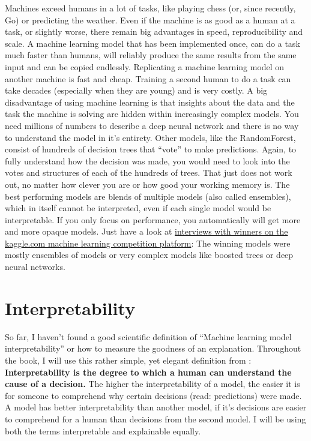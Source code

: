 \documentclass[12pt,]{krantz}
\theoremstyle{definition}
\theoremstyle{definition}
\theoremstyle{definition}
\theoremstyle{remark}
\begin{document}
Machines exceed humans in a lot of tasks, like playing chess (or, since
recently, Go) or predicting the weather. Even if the machine is as good
as a human at a task, or slightly worse, there remain big advantages in
speed, reproducibility and scale. A machine learning model that has been
implemented once, can do a task much faster than humans, will reliably
produce the same results from the same input and can be copied
endlessly. Replicating a machine learning model on another machine is
fast and cheap. Training a second human to do a task can take decades
(especially when they are young) and is very costly. A big disadvantage
of using machine learning is that insights about the data and the task
the machine is solving are hidden within increasingly complex models.
You need millions of numbers to describe a deep neural network and there
is no way to understand the model in it's entirety. Other models, like
the RandomForest, consist of hundreds of decision trees that ``vote'' to
make predictions. Again, to fully understand how the decision was made,
you would need to look into the votes and structures of each of the
hundreds of trees. That just does not work out, no matter how clever you
are or how good your working memory is. The best performing models are
blends of multiple models (also called ensembles), which in itself
cannot be interpreted, even if each single model would be interpretable.
If you only focus on performance, you automatically will get more and
more opaque models. Just have a look at
\href{http://blog.kaggle.com/}{interviews with winners on the kaggle.com
machine learning competition platform}: The winning models were mostly
ensembles of models or very complex models like boosted trees or deep
neural networks.

\chapter{Interpretability}\label{interpretability}

So far, I haven't found a good scientific definition of ``Machine
learning model interpretability'' or how to measure the goodness of an
explanation. Throughout the book, I will use this rather simple, yet
elegant definition from \citet{miller2017explanation}:
\textbf{Interpretability is the degree to which a human can understand
the cause of a decision.} The higher the interpretability of a model,
the easier it is for someone to comprehend why certain decisions (read:
predictions) were made. A model has better interpretability than another
model, if it's decisions are easier to comprehend for a human than
decisions from the second model. I will be using both the terms
interpretable and explainable equally.
\end{document}
